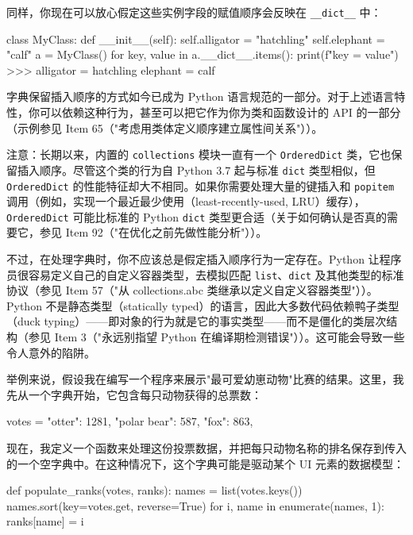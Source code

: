同样，你现在可以放心假定这些实例字段的赋值顺序会反映在 \texttt{\_\_dict\_\_} 中：

\begin{codebox}[python]
class MyClass:
    def __init__(self):
        self.alligator = "hatchling"
        self.elephant = "calf"
a = MyClass()
for key, value in a.__dict__.items():
    print(f"{key} = {value}")
>>>
alligator = hatchling
elephant = calf
\end{codebox}

字典保留插入顺序的方式如今已成为 Python 语言规范的一部分。对于上述语言特性，你可以依赖这种行为，甚至可以把它作为你为类和函数设计的 API 的一部分（示例参见 Item 65（"考虑用类体定义顺序建立属性间关系"））。

注意：长期以来，内置的 \texttt{collections} 模块一直有一个 \texttt{OrderedDict} 类，它也保留插入顺序。尽管这个类的行为自 Python 3.7 起与标准 \texttt{dict} 类型相似，但 \texttt{OrderedDict} 的性能特征却大不相同。如果你需要处理大量的键插入和 \texttt{popitem} 调用（例如，实现一个最近最少使用（least-recently-used, LRU）缓存），\texttt{OrderedDict} 可能比标准的 Python \texttt{dict} 类型更合适（关于如何确认是否真的需要它，参见 Item 92（"在优化之前先做性能分析"））。

不过，在处理字典时，你不应该总是假定插入顺序行为一定存在。Python 让程序员很容易定义自己的自定义容器类型，去模拟匹配 \texttt{list}、\texttt{dict} 及其他类型的标准协议（参见 Item 57（"从 collections.abc 类继承以定义自定义容器类型"））。Python 不是静态类型（statically typed）的语言，因此大多数代码依赖鸭子类型（duck typing）——即对象的行为就是它的事实类型——而不是僵化的类层次结构（参见 Item 3（"永远别指望 Python 在编译期检测错误"））。这可能会导致一些令人意外的陷阱。

举例来说，假设我在编写一个程序来展示"最可爱幼崽动物"比赛的结果。这里，我先从一个字典开始，它包含每只动物获得的总票数：

\begin{codebox}[python]
votes = {
    "otter": 1281,
    "polar bear": 587,
    "fox": 863,
}
\end{codebox}

现在，我定义一个函数来处理这份投票数据，并把每只动物名称的排名保存到传入的一个空字典中。在这种情况下，这个字典可能是驱动某个 UI 元素的数据模型：

\begin{codebox}[python]
def populate_ranks(votes, ranks):
    names = list(votes.keys())
    names.sort(key=votes.get, reverse=True)
    for i, name in enumerate(names, 1):
        ranks[name] = i
\end{codebox}

